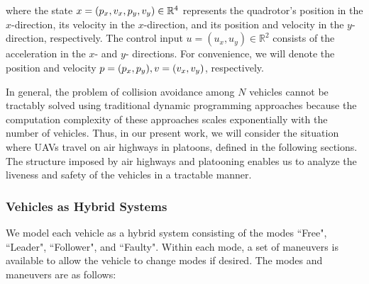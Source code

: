 \noindent where the state $x=(p_x, v_x, p_y, v_y)\in\mathbb{R}^4$ represents the quadrotor's position in the $x$-direction, its velocity in the $x$-direction, and its position and velocity in the $y$-direction, respectively. The control input $u = (u_x, u_y)\in\mathbb{R}^2$ consists of the acceleration in the $x$- and $y$- directions. For convenience, we will denote the position and velocity $p=(p_x, p_y),v=(v_x,v_y)$, respectively. 

In general, the problem of collision avoidance among $N$ vehicles cannot be tractably solved using traditional dynamic programming approaches because the computation complexity of these approaches scales exponentially with the number of vehicles. Thus, in our present work, we will consider the situation where UAVs travel on air highways in platoons, defined in the following sections. The structure imposed by air highways and platooning enables us to analyze the liveness and safety of the vehicles in a tractable manner.

\subsubsection{Vehicles as Hybrid Systems}
We model each vehicle as a hybrid system \cite{Lygeros98,Lygeros12} consisting of the modes ``Free", ``Leader", ``Follower", and ``Faulty". Within each mode, a set of maneuvers is available to allow the vehicle to change modes if desired. The modes and maneuvers are as follows:

